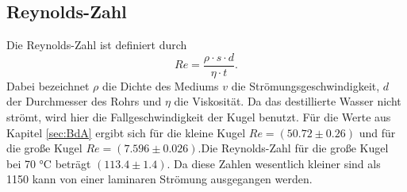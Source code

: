 \subsection{Reynolds-Zahl}
Die Reynolds-Zahl \cite{wiki} ist definiert durch
\begin{equation*}
  Re = \frac{\rho\cdot s\cdot d}{\eta \cdot t}.
\end{equation*}
Dabei bezeichnet $\rho$ die Dichte des Mediums $v$ die Strömungsgeschwindigkeit,
$d$ der Durchmesser des Rohrs und $\eta$ die Viskosität.
Da das destillierte Wasser nicht
strömt, wird hier die Fallgeschwindigkeit der Kugel benutzt.
Für die Werte aus Kapitel \ref{sec:BdA} ergibt sich
für die kleine Kugel $Re = (50.72 \pm 0.26)$ und für die große Kugel
$ Re = (7.596 \pm 0.026) $.Die Reynolds-Zahl für die große Kugel bei 70 \si{\celsius}
beträgt $(113.4 \pm 1.4)$. Da diese Zahlen wesentlich kleiner sind als
1150 kann von einer laminaren Strömung ausgegangen werden.
